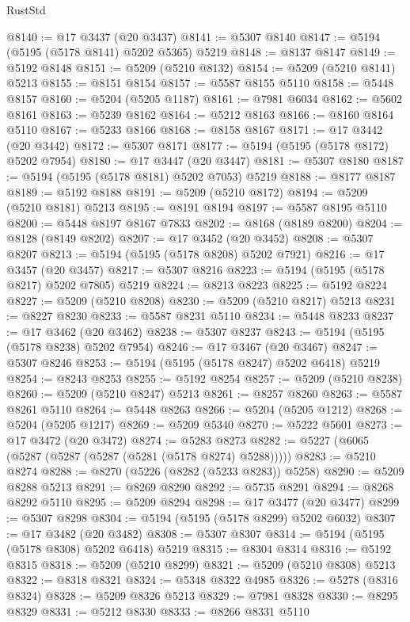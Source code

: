\begin{lexlean}{RustStd}
\begin{coremodule}
@8140 := @17 @3437 (@20 @3437)
@8141 := @5307 @8140
@8147 := @5194 (@5195 (@5178 @8141) @5202 @5365) @5219
@8148 := @8137 @8147
@8149 := @5192 @8148
@8151 := @5209 (@5210 @8132)
@8154 := @5209 (@5210 @8141) @5213
@8155 := @8151 @8154
@8157 := @5587 @8155 @5110
@8158 := @5448 @8157
@8160 := @5204 (@5205 @1187)
@8161 := @7981 @6034
@8162 := @5602 @8161
@8163 := @5239 @8162
@8164 := @5212 @8163
@8166 := @8160 @8164 @5110
@8167 := @5233 @8166
@8168 := @8158 @8167
@8171 := @17 @3442 (@20 @3442)
@8172 := @5307 @8171
@8177 := @5194 (@5195 (@5178 @8172) @5202 @7954)
@8180 := @17 @3447 (@20 @3447)
@8181 := @5307 @8180
@8187 := @5194 (@5195 (@5178 @8181) @5202 @7053) @5219
@8188 := @8177 @8187
@8189 := @5192 @8188
@8191 := @5209 (@5210 @8172)
@8194 := @5209 (@5210 @8181) @5213
@8195 := @8191 @8194
@8197 := @5587 @8195 @5110
@8200 := @5448 @8197 @8167 @7833
@8202 := @8168 (@8189 @8200)
@8204 := @8128 (@8149 @8202)
@8207 := @17 @3452 (@20 @3452)
@8208 := @5307 @8207
@8213 := @5194 (@5195 (@5178 @8208) @5202 @7921)
@8216 := @17 @3457 (@20 @3457)
@8217 := @5307 @8216
@8223 := @5194 (@5195 (@5178 @8217) @5202 @7805) @5219
@8224 := @8213 @8223
@8225 := @5192 @8224
@8227 := @5209 (@5210 @8208)
@8230 := @5209 (@5210 @8217) @5213
@8231 := @8227 @8230
@8233 := @5587 @8231 @5110
@8234 := @5448 @8233
@8237 := @17 @3462 (@20 @3462)
@8238 := @5307 @8237
@8243 := @5194 (@5195 (@5178 @8238) @5202 @7954)
@8246 := @17 @3467 (@20 @3467)
@8247 := @5307 @8246
@8253 := @5194 (@5195 (@5178 @8247) @5202 @6418) @5219
@8254 := @8243 @8253
@8255 := @5192 @8254
@8257 := @5209 (@5210 @8238)
@8260 := @5209 (@5210 @8247) @5213
@8261 := @8257 @8260
@8263 := @5587 @8261 @5110
@8264 := @5448 @8263
@8266 := @5204 (@5205 @1212)
@8268 := @5204 (@5205 @1217)
@8269 := @5209 @5340
@8270 := @5222 @5601
@8273 := @17 @3472 (@20 @3472)
@8274 := @5283 @8273
@8282 := @5227 (@6065 (@5287 (@5287 (@5287 (@5281 (@5178 @8274) @5288)))))
@8283 := @5210 @8274
@8288 := @8270 (@5226 (@8282 (@5233 @8283)) @5258)
@8290 := @5209 @8288 @5213
@8291 := @8269 @8290
@8292 := @5735 @8291
@8294 := @8268 @8292 @5110
@8295 := @5209 @8294
@8298 := @17 @3477 (@20 @3477)
@8299 := @5307 @8298
@8304 := @5194 (@5195 (@5178 @8299) @5202 @6032)
@8307 := @17 @3482 (@20 @3482)
@8308 := @5307 @8307
@8314 := @5194 (@5195 (@5178 @8308) @5202 @6418) @5219
@8315 := @8304 @8314
@8316 := @5192 @8315
@8318 := @5209 (@5210 @8299)
@8321 := @5209 (@5210 @8308) @5213
@8322 := @8318 @8321
@8324 := @5348 @8322 @4985
@8326 := @5278 (@8316 @8324)
@8328 := @5209 @8326 @5213
@8329 := @7981 @8328
@8330 := @8295 @8329
@8331 := @5212 @8330
@8333 := @8266 @8331 @5110

\end{coremodule}
\end{lexlean}
